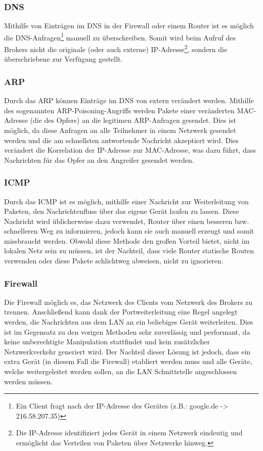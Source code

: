         \subsubsection{DNS}
        Mithilfe von Einträgen im \ac{DNS} in der Firewall oder einem Router ist es möglich die \ac{DNS}-Anfragen\footnote{Ein Client fragt nach der \acs{IP}-Adresse des Gerätes (z.B.: google.de -> 216.58.207.35)} manuell zu überschreiben. Somit wird beim Aufruf des Brokers nicht die originale (oder auch externe) IP-Adresse\footnote{Die \acs{IP}-Adresse identifiziert jedes Gerät in einem Netzwerk eindeutig und ermöglicht das Verteilen von Paketen über Netzwerke hinweg.}, sondern die überschriebene zur Verfügung gestellt.
        \subsubsection{ARP}
        Durch das \ac{ARP} können Einträge im \ac{DNS} von extern verändert werden. Mithilfe des sogenannten \acs{ARP}-Poisoning-Angriffs werden Pakete einer veränderten \ac{MAC}-Adresse (die des Opfers) an die legitimen \ac{ARP}-Anfragen gesendet. Dies ist möglich, da diese Anfragen an alle Teilnehmer in einem Netzwerk gesendet werden und die am schnellsten antwortende Nachricht akzeptiert wird. Dies verändert die Korrelation der \acs{IP}-Adresse zur \acs{MAC}-Adresse, was dazu führt, dass Nachrichten für das Opfer an den Angreifer gesendet werden. \cite{4768661}
        \subsubsection{ICMP}
        Durch das \ac{ICMP} ist es möglich, mithilfe einer Nachricht zur Weiterleitung von Paketen, den Nachrichtenfluss über das eigene Gerät laufen zu lassen.
        Diese Nachricht wird üblicherweise dazu verwendet, Router über einen besseren bzw. schnelleren Weg zu informieren, jedoch kann sie auch manuell erzeugt und somit missbraucht werden. Obwohl diese Methode den großen Vorteil bietet, nicht im lokalen Netz sein zu müssen, ist der Nachteil, dass viele Router statische Routen verwenden oder diese Pakete schlichtweg abweisen, nicht zu ignorieren.
        \subsubsection{Firewall}
        Die Firewall möglich es, das Netzwerk des Clients vom Netzwerk des Brokers zu trennen. Anschließend kann dank der Portweiterleitung eine Regel angelegt werden, die Nachrichten aus dem \ac{LAN} an ein beliebiges Gerät weiterleiten. Dies ist im Gegensatz zu den vorigen Methoden sehr zuverlässig und performant, da keine unberechtigte Manipulation stattfindet und kein zusätzlicher Netzwerkverkehr generiert wird. Der Nachteil dieser Lösung ist jedoch, dass ein extra Gerät (in diesem Fall die Firewall) etabliert werden muss und alle Geräte, welche weitergeleitet werden sollen, an die \ac{LAN} Schnittstelle angeschlossen werden müssen.
        
